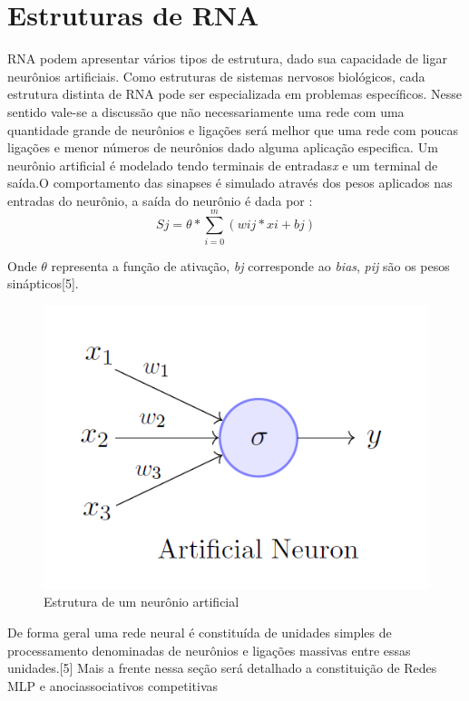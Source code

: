 \section{Estruturas de RNA}
RNA podem apresentar vários tipos de estrutura, dado sua capacidade de ligar neurônios artificiais. Como estruturas de sistemas nervosos biológicos, cada estrutura distinta de RNA pode ser especializada em problemas específicos. Nesse sentido vale-se a discussão que não necessariamente uma rede com uma quantidade grande de neurônios e ligações será melhor que uma rede com poucas ligações e menor números de neurônios dado alguma aplicação especifica.
Um neurônio artificial é modelado tendo terminais de entradas\textit{x} e um terminal de saída.O comportamento das sinapses é simulado através dos pesos aplicados nas entradas do neurônio, a saída do neurônio é dada por : 
\begin{equation}
Sj = \theta *\sum_{i=0}^{m} (wij*xi+bj)
\end{equation}

Onde $\theta$ representa a função de ativação, \textit{bj} corresponde ao \textit{bias}, \textit{pij} são os pesos sinápticos[5].
\begin{figure}[H]

\centering %
\includegraphics[width=\columnwidth]{04-Figuras/fig}
\caption{Estrutura de um neurônio artificial}

\label{figura:arquitetura}

\end{figure}
De forma geral uma rede neural é constituída de unidades simples de processamento denominadas de neurônios e ligações massivas entre essas unidades.[5]
Mais a frente nessa seção será detalhado a constituição de Redes MLP e anociassociativos competitivas


